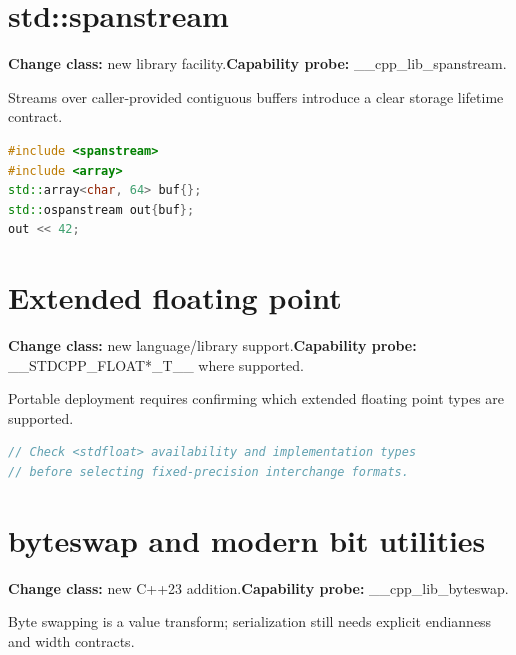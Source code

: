 \documentclass[11pt]{article}
\begin{document}
\section{std::spanstream}
\textbf{Change class:} new library facility.\quad \textbf{Capability probe:} \_\_cpp\_lib\_spanstream.

Streams over caller-provided contiguous buffers introduce a clear storage lifetime contract.

\begin{lstlisting}[language=C++]
#include <spanstream>
#include <array>
std::array<char, 64> buf{};
std::ospanstream out{buf};
out << 42;
\end{lstlisting}
\section{Extended floating point}
\textbf{Change class:} new language/library support.\quad \textbf{Capability probe:} \_\_STDCPP\_FLOAT*\_T\_\_ where supported.

Portable deployment requires confirming which extended floating point types are supported.

\begin{lstlisting}[language=C++]
// Check <stdfloat> availability and implementation types
// before selecting fixed-precision interchange formats.
\end{lstlisting}
\section{byteswap and modern bit utilities}
\textbf{Change class:} new C++23 addition.\quad \textbf{Capability probe:} \_\_cpp\_lib\_byteswap.

Byte swapping is a value transform; serialization still needs explicit endianness and width contracts.
\end{document}
